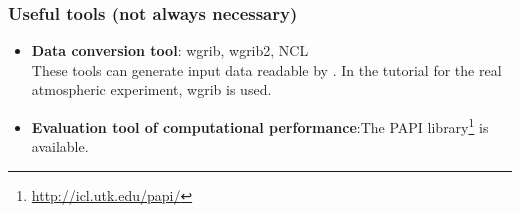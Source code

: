 \subsubsection{Useful tools (not always necessary)}
\begin{itemize}
  \item {\bf Data conversion tool}: wgrib, wgrib2, NCL\\
  These tools can generate input data readable by \scalerm.
  In the tutorial for the real atmospheric experiment, wgrib is used.
  \item {\bf Evaluation tool of computational performance}:The PAPI library\footnote{\url{http://icl.utk.edu/papi/}} is available.
\end{itemize}
